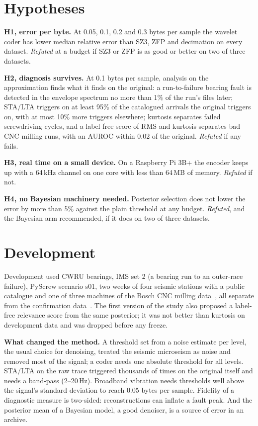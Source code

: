 \documentclass[sigconf,nonacm]{acmart}
\begin{document}
\section{Hypotheses}\label{sec:hyp}
\textbf{H1, error per byte.} At 0.05, 0.1, 0.2 and 0.3 bytes per sample the wavelet coder has lower median relative error than SZ3, ZFP and decimation on every dataset. \emph{Refuted} at a budget if SZ3 or ZFP is as good or better on two of three datasets.

\textbf{H2, diagnosis survives.} At 0.1 bytes per sample, analysis on the approximation finds what it finds on the original: a run-to-failure bearing fault is detected in the envelope spectrum no more than 1\% of the run's files later; STA/LTA triggers on at least 95\% of the catalogued arrivals the original triggers on, with at most 10\% more triggers elsewhere; kurtosis separates failed screwdriving cycles, and a label-free score of RMS and kurtosis separates bad CNC milling runs, with an AUROC within 0.02 of the original. \emph{Refuted} if any fails.

\textbf{H3, real time on a small device.} On a Raspberry Pi 3B+ the encoder keeps up with a 64\,kHz channel on one core with less than 64\,MB of memory. \emph{Refuted} if not.

\textbf{H4, no Bayesian machinery needed.} Posterior selection does not lower the error by more than 5\% against the plain threshold at any budget. \emph{Refuted}, and the Bayesian arm recommended, if it does on two of three datasets.

\section{Development}\label{sec:dev}
Development used CWRU bearings, IMS set 2 (a bearing run to an outer-race failure), PyScrew scenario s01, two weeks of four seismic stations with a public catalogue and one of three machines of the Bosch CNC milling data~\cite{tnani2022}, all separate from the confirmation data~\cite{f2}. The first version of the study also proposed a label-free relevance score from the same posterior; it was not better than kurtosis on development data and was dropped before any freeze.

\textbf{What changed the method.} A threshold set from a noise estimate per level, the usual choice for denoising, treated the seismic microseism as noise and removed most of the signal; a coder needs one absolute threshold for all levels. STA/LTA on the raw trace triggered thousands of times on the original itself and needs a band-pass (2--20\,Hz). Broadband vibration needs thresholds well above the signal's standard deviation to reach 0.05 bytes per sample. Fidelity of a diagnostic measure is two-sided: reconstructions can inflate a fault peak. And the posterior mean of a Bayesian model, a good denoiser, is a source of error in an archive.
\end{document}
